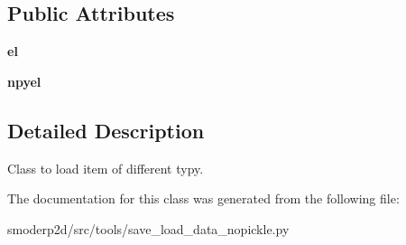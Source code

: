 \subsection*{Public Attributes}
\begin{DoxyCompactItemize}
\item 
\hypertarget{classsmoderp2d_1_1src_1_1tools_1_1save__load__data__nopickle_1_1LoadItems_a6040f17ef701cee845a742b55eb00731}{{\bfseries el}}\label{classsmoderp2d_1_1src_1_1tools_1_1save__load__data__nopickle_1_1LoadItems_a6040f17ef701cee845a742b55eb00731}

\item 
\hypertarget{classsmoderp2d_1_1src_1_1tools_1_1save__load__data__nopickle_1_1LoadItems_ac4d2dd0def0a15b24ceedbbcefba9664}{{\bfseries npyel}}\label{classsmoderp2d_1_1src_1_1tools_1_1save__load__data__nopickle_1_1LoadItems_ac4d2dd0def0a15b24ceedbbcefba9664}

\end{DoxyCompactItemize}


\subsection{Detailed Description}
Class to load item of different typy. 

The documentation for this class was generated from the following file\-:\begin{DoxyCompactItemize}
\item 
smoderp2d/src/tools/save\-\_\-load\-\_\-data\-\_\-nopickle.\-py\end{DoxyCompactItemize}
